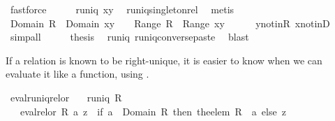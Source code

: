 \begin{isabellebody}
\ fastforce\isanewline
\ \ \isamarkupfalse%
\ \isamarkupfalse%
\ {\isachardoublequoteopen}runiq\ {\isacharparenleft}{\isacharbraceleft}{\isacharparenleft}x{\isacharcomma}y{\isacharparenright}{\isacharbraceright}{\isasyminverse}{\isacharparenright}{\isachardoublequoteclose}\ \isamarkupfalse%
\ runiq{\isacharunderscore}singleton{\isacharunderscore}rel\ \isamarkupfalse%
\ metis\isanewline
\ \ \isamarkupfalse%
\ \isamarkupfalse%
\ {\isachardoublequoteopen}Domain\ R\ {\isasyminter}\ Domain\ {\isacharbraceleft}{\isacharparenleft}x{\isacharcomma}y{\isacharparenright}{\isacharbraceright}\ {\isacharequal}\ {\isacharbraceleft}{\isacharbraceright}{\isachardoublequoteclose}\ \ {\isachardoublequoteopen}Range\ R\ {\isasyminter}\ {\isacharparenleft}Range\ {\isacharbraceleft}{\isacharparenleft}x{\isacharcomma}y{\isacharparenright}{\isacharbraceright}{\isacharparenright}{\isacharequal}{\isacharbraceleft}{\isacharbraceright}{\isachardoublequoteclose}\isanewline
\ \ \ \ \isamarkupfalse%
\ y{\isacharunderscore}notin{\isacharunderscore}R\ x{\isacharunderscore}notin{\isacharunderscore}D\ \isamarkupfalse%
\ simp{\isacharunderscore}all\isanewline
\ \ \isamarkupfalse%
\ \isamarkupfalse%
\ {\isacharquery}thesis\ \isamarkupfalse%
\ runiq\ runiq{\isacharunderscore}converse{\isacharunderscore}paste\ \isamarkupfalse%
\ blast\isanewline
{}\isamarkupfalse%
%
\endisatagproof
{\isafoldproof}%
%
\isadelimproof
%
\endisadelimproof
%
\begin{isamarkuptext}%
If a relation is known to be right-unique, it is easier to know when we can evaluate it
  like a function, using .%
\end{isamarkuptext}%
\isamarkuptrue%
\isamarkupfalse%
\ eval{\isacharunderscore}runiq{\isacharunderscore}rel{\isacharunderscore}or{\isacharcolon}\isanewline
\ \ \ {\isachardoublequoteopen}runiq\ R{\isachardoublequoteclose}\isanewline
\ \ \ {\isachardoublequoteopen}eval{\isacharunderscore}rel{\isacharunderscore}or\ R\ a\ z\ {\isacharequal}\ {\isacharparenleft}if\ a\ {\isasymin}\ Domain\ R\ then\ the{\isacharunderscore}elem\ {\isacharparenleft}R\ {\isacharbackquote}{\isacharbackquote}\ {\isacharbraceleft}a{\isacharbraceright}{\isacharparenright}\ else\ z{\isacharparenright}{\isachardoublequoteclose}\isanewline

\end{isabellebody}
